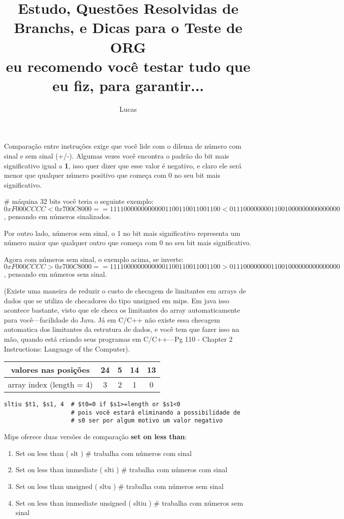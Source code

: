 \documentclass{article}
\author{Lucas}
\title{Estudo, Questões Resolvidas de Branchs, e Dicas para o Teste de ORG\\
\small{eu recomendo você testar tudo que eu fiz, para garantir...}}
\begin{document}
\maketitle

Comparação entre instruções exige que você lide com o dilema de número com sinal
e sem sinal (+/-). Algumas vezes você encontra o padrão do bit mais
significativo igual a \textbf{1}, isso quer dizer que esse valor é negativo, e
claro ele será menor que qualquer número positivo que começa com 0 no seu bit
mais significativo.

\# máquina 32 bits você teria o seguinte exemplo:\\
$0xF000CCCC < 0x700C8000 == 11110000000000001100110011001100 < 
01110000000011001000000000000000$, pensando em números sinalizados.

Por outro lado, números sem sinal, o 1 no bit mais significativo representa um
número maior que qualquer outro que começa com 0 no seu bit mais significativo.

Agora com números sem sinal, o exemplo acima, se inverte:\\
$0xF000CCCC > 0x700C8000 == 11110000000000001100110011001100 >    
01110000000011001000000000000000$, pensando em números sem sinal.

(Existe uma maneira de reduzir o custo de checagem de limitantes em arrays de
dados que se utiliza de checadores do tipo unsigned em mips. Em java isso
acontece bastante, visto que ele checa os limitantes do array automaticamente
para você---facilidade do Java. Já em C/C++ não existe essa checagem automatica
dos limitantes da estrutura de dados, e você tem que fazer isso na mão, quando
está criando seus programas em C/C++---Pg 110 - Chapter 2  Instructions: 
Language of the Computer).

\begin{tabular}{|c|c|c|c|c|}
\hline valores nas posições & 24 & 5 & 14 & 13 \\
\hline array index (length = 4) & 3 & 2 & 1 & 0 \\
\hline
\end{tabular}

\begin{verbatim}
sltiu $t1, $s1, 4  # $t0=0 if $s1>=length or $s1<0
                   # pois você estará eliminando a possibilidade de
                   # s0 ser por algum motivo um valor negativo
\end{verbatim}

Mips oferece duas versões de comparação \textbf{set on less than}:
\begin{enumerate}
\item Set on less than ( slt ) \# trabalha com números com sinal
\item Set on less than immediate ( slti ) \# trabalha com números com sinal

\item Set on less than unsigned ( sltu ) \# trabalha com números sem sinal
\item Set on less than immediate unsigned ( sltiu ) \# trabalha com números sem 
sinal
\end{enumerate}
\end{document}
